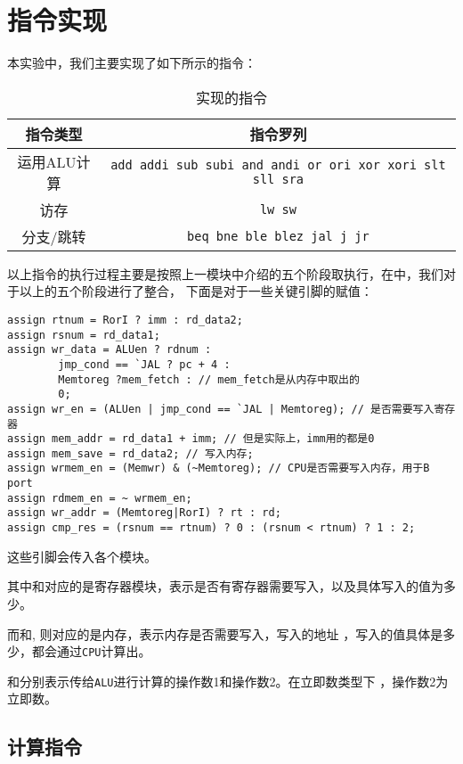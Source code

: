 \section{指令实现}
\songti
\hspace*{5mm}本实验中，我们主要实现了如下所示的指令：

\begin{table}
	\centering
	\caption{实现的指令}
	\renewcommand\arraystretch{1.5}
	\kaishu
	\begin{tabular}{cc}  
		\toprule[1pt]  
		\rowcolor[gray]{0.9}   指令类型 & 指令罗列\\  
		\midrule  
		运用ALU计算&\texttt{add addi sub subi and andi or ori xor xori slt sll sra}\\
		访存&\texttt{lw sw}\\
		分支/跳转&\texttt{beq bne ble blez jal j jr}\\
		\bottomrule[1pt]  
		\end{tabular} 
\end{table}

\kaishu
以上指令的执行过程主要是按照上一模块中介绍的五个阶段取执行，在中，我们对于以上的五个阶段进行了整合，
下面是对于一些关键引脚的赋值：
\begin{lstlisting}[style = verilog-style, caption = {CPU主模块对于一些引脚的分配}]
assign rtnum = RorI ? imm : rd_data2;
assign rsnum = rd_data1;
assign wr_data = ALUen ? rdnum : 
		jmp_cond == `JAL ? pc + 4 : 
		Memtoreg ?mem_fetch : // mem_fetch是从内存中取出的
		0;
assign wr_en = (ALUen | jmp_cond == `JAL | Memtoreg); // 是否需要写入寄存器
assign mem_addr = rd_data1 + imm; // 但是实际上，imm用的都是0
assign mem_save = rd_data2; // 写入内存;
assign wrmem_en = (Memwr) & (~Memtoreg); // CPU是否需要写入内存，用于B port
assign rdmem_en = ~ wrmem_en;
assign wr_addr = (Memtoreg|RorI) ? rt : rd;
assign cmp_res = (rsnum == rtnum) ? 0 : (rsnum < rtnum) ? 1 : 2;
\end{lstlisting}

这些引脚会传入各个模块。

其中和对应的是寄存器模块，表示是否有寄存器需要写入，以及具体写入的值为多少。

而和, 则对应的是内存，表示内存是否需要写入，写入的地址
，写入的值具体是多少，都会通过\texttt{CPU}计算出。

和分别表示传给\texttt{ALU}进行计算的操作数1和操作数2。在立即数类型下
，操作数2为立即数。
\subsection{计算指令}

